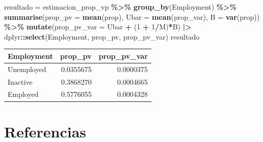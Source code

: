 \documentclass[
  12pt,
]{book}
\newenvironment{Shaded}{\begin{snugshade}}{\end{snugshade}}
\newcommand{\AttributeTok}[1]{\textcolor[rgb]{0.13,0.29,0.53}{#1}}
\newcommand{\DecValTok}[1]{\textcolor[rgb]{0.00,0.00,0.81}{#1}}
\newcommand{\FunctionTok}[1]{\textcolor[rgb]{0.13,0.29,0.53}{\textbf{#1}}}
\newcommand{\NormalTok}[1]{#1}
\newcommand{\OtherTok}[1]{\textcolor[rgb]{0.56,0.35,0.01}{#1}}
\newcommand{\SpecialCharTok}[1]{\textcolor[rgb]{0.81,0.36,0.00}{\textbf{#1}}}
\begin{document}
\begin{Shaded}
\begin{Highlighting}[]
\NormalTok{resultado }\OtherTok{=}\NormalTok{ estimacion\_prop\_vp }\SpecialCharTok{\%\textgreater{}\%} 
  \FunctionTok{group\_by}\NormalTok{(Employment) }\SpecialCharTok{\%\textgreater{}\%} 
  \FunctionTok{summarise}\NormalTok{(}\AttributeTok{prop\_pv =} \FunctionTok{mean}\NormalTok{(prop),}
            \AttributeTok{Ubar =} \FunctionTok{mean}\NormalTok{(prop\_var),}
            \AttributeTok{B =} \FunctionTok{var}\NormalTok{(prop)) }\SpecialCharTok{\%\textgreater{}\%} 
  \FunctionTok{mutate}\NormalTok{(}\AttributeTok{prop\_pv\_var =}\NormalTok{ Ubar }\SpecialCharTok{+}\NormalTok{ (}\DecValTok{1} \SpecialCharTok{+} \DecValTok{1}\SpecialCharTok{/}\NormalTok{M)}\SpecialCharTok{*}\NormalTok{B) }\SpecialCharTok{|\textgreater{}} 
\NormalTok{  dplyr}\SpecialCharTok{::}\FunctionTok{select}\NormalTok{(Employment, prop\_pv, prop\_pv\_var)}
\NormalTok{resultado}
\end{Highlighting}
\end{Shaded}

\begin{tabular}{l|r|r}
\hline
Employment & prop\_pv & prop\_pv\_var\\
\hline
Unemployed & 0.0355675 & 0.0000375\\
\hline
Inactive & 0.3868270 & 0.0004665\\
\hline
Employed & 0.5776055 & 0.0004328\\
\hline
\end{tabular}

\chapter{Referencias}\label{referencias}
\end{document}
